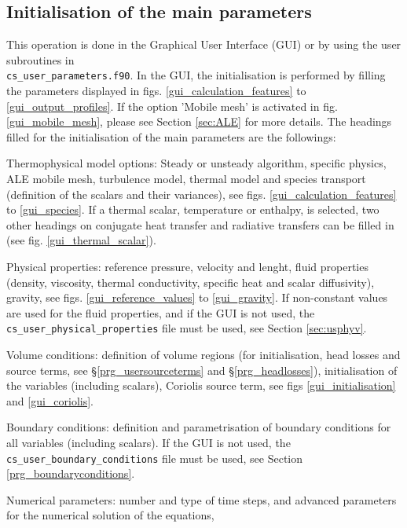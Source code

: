 {{%
\subsection{Initialisation of the main parameters}

This operation is done in the Graphical User Interface (GUI) or by using the user subroutines in \\ \texttt{cs\_user\_parameters.f90}.
In the GUI, the initialisation is performed by filling the parameters displayed in figs. \ref{gui_calculation_features} 
to \ref{gui_output_profiles}. If the option 'Mobile mesh' is activated in fig. \ref{gui_mobile_mesh}, 
please see Section \ref{sec:ALE} for more details. The headings filled for the initialisation of the main parameters 
are the followings:
\begin{list}{-}{}
\item Thermophysical model options: Steady or unsteady algorithm, specific physics, ALE mobile mesh,
      turbulence model, thermal model and species transport (definition of the scalars and their variances), 
see figs. \ref{gui_calculation_features} to \ref{gui_species}. If a thermal scalar, temperature or enthalpy, is selected, 
two other headings on conjugate heat transfer and radiative transfers can be filled in (see fig. \ref{gui_thermal_scalar}).
\item Physical properties: reference pressure, velocity and lenght, fluid properties (density, viscosity, thermal conductivity, 
specific heat and scalar diffusivity), gravity, see figs. \ref{gui_reference_values} to \ref{gui_gravity}. 
If non-constant values are used for the fluid properties, and if the GUI is not used, the \\ \texttt{cs\_user\_physical\_properties} 
file must be used, see Section \ref{sec:usphyv}.
\item Volume conditions: definition of volume regions (for initialisation, head losses and source terms, 
see \S\ref{prg_usersourceterms} and \S\ref{prg_headlosses}), initialisation of the variables (including scalars), 
Coriolis source term, see figs \ref{gui_initialisation} and \ref{gui_coriolis}.
\item Boundary conditions: definition and parametrisation of boundary conditions for all variables (including scalars). 
If the GUI is not used, the \texttt{cs\_user\_boundary\_conditions} file must be used, see Section \ref{prg_boundaryconditions}.
\item Numerical parameters: number and type of time steps, and advanced parameters for the numerical solution of the equations, 

\end{list}}}

